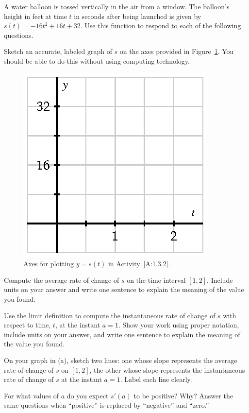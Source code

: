 \begin{activity}  \label{A:1.3.2}
A water balloon is tossed vertically in the air from a window.  The balloon's height in feet at time $t$ in seconds after being launched is given by $s(t) = -16t^2 + 16t + 32$. Use this function to respond to each of the following questions.
\ba
	\item Sketch an accurate, labeled graph of $s$ on the axes provided in Figure~\ref{F:1.3.Act2}.  You should be able to do this without using computing technology.
	\begin{figure}[h]
	\begin{center}	
	\includegraphics{figures/1_3_Act2.eps}
	\caption{Axes for plotting $y = s(t)$ in Activity~\ref{A:1.3.2}.} \label{F:1.3.Act2}
	\end{center}
	\end{figure}
		
	\item Compute the average rate of change of $s$ on the time interval $[1,2]$.  Include units on your answer and write one sentence to explain the meaning of the value you found.  
	\item Use the limit definition to compute the instantaneous rate of change of $s$ with respect to time, $t$, at the instant $a = 1$.  Show your work using proper notation, include units on your answer, and write one sentence to explain the meaning of the value you found.
	\item On your graph in (a), sketch two lines:  one whose slope represents the average rate of change of $s$ on $[1,2]$, the other whose slope represents the instantaneous rate of change of $s$ at the instant $a=1$.  Label each line clearly.
	\item For what values of $a$ do you expect $s'(a)$ to be positive?  Why?  Answer the same questions when ``positive'' is replaced by ``negative'' and  ``zero.'' 
\ea
\end{activity}
